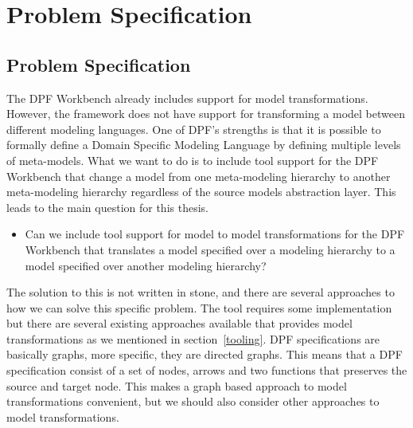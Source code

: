 
\chapter{Problem Specification} %

\label{Chapter4} %



\section{Problem Specification}
\label{problem}

The DPF Workbench already includes support for model transformations. However,
the framework does not have support for transforming a model between different
modeling languages. One of DPF's strengths is that it is possible to formally
define a Domain Specific Modeling Language by defining multiple levels of
meta-models. What we want to do is to include tool support for the DPF Workbench
that change a model from one meta-modeling hierarchy to another meta-modeling
hierarchy regardless of the source models abstraction layer. This leads to the
main question for this thesis.

\begin{itemize}
  
  \item Can we include tool support for model to model transformations for the
  DPF Workbench that translates a model specified over a modeling hierarchy to a
  model specified over another modeling hierarchy?

\end{itemize}

The solution to this is not written in stone, and there are several approaches
to how we can solve this specific problem. The tool requires some implementation
but there are several existing approaches available that provides model
transformations as we mentioned in section~\ref{tooling}. DPF specifications are
basically graphs, more specific, they are directed graphs. This means that a
DPF specification consist of a set of nodes, arrows and two functions that
preserves the source and target node. This makes a graph based approach to model
transformations convenient, but we should also consider other approaches to
model transformations. 

